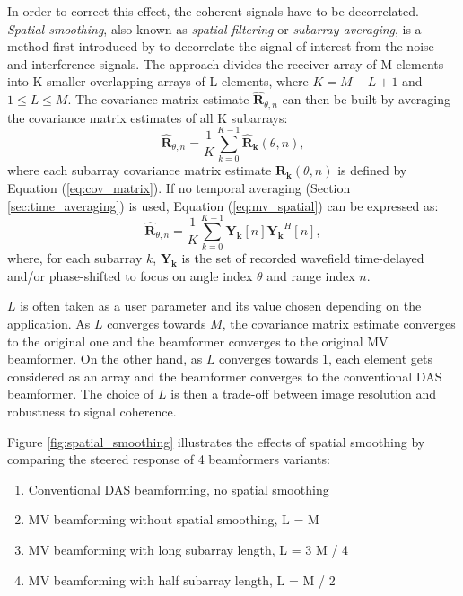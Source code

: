 In order to correct this effect, the coherent signals have to be decorrelated. \textit{Spatial smoothing}, also known as \textit{spatial filtering} or \textit{subarray averaging}, is a method first introduced by \cite{Evans_spatial} to decorrelate the signal of interest from the noise-and-interference signals. The approach divides the receiver array of M elements into K smaller overlapping arrays of L elements, where $K = M - L + 1$ and $1 \leq L \leq M$. The covariance matrix estimate $\boldsymbol{\hat{R}}_{\theta, n}$ can then be built by averaging the covariance matrix estimates of all K subarrays:
\begin{equation}
    \boldsymbol{\hat{R}}_{\theta, n} = \frac{1}{K} \sum_{k=0}^{K-1} \boldsymbol{\hat{R}_k}(\theta, n),
\label{eq:mv_spatial}
\end{equation}
\noindent
where each subarray covariance matrix estimate $\boldsymbol{R_k}(\theta, n)$ is defined by Equation (\ref{eq:cov_matrix}). If no temporal averaging (Section \ref{sec:time_averaging}) is used, Equation (\ref{eq:mv_spatial}) can be expressed as:
\begin{equation}
    \boldsymbol{\hat{R}}_{\theta, n} = \frac{1}{K} \sum_{k=0}^{K-1} \boldsymbol{Y_k}[n] \boldsymbol{Y_k}^H[n],
\end{equation}
\noindent
where, for each subarray $k$, $\boldsymbol{Y_k}$ is the set of recorded wavefield time-delayed and/or phase-shifted to focus on angle index $\theta$ and range index $n$.

$L$ is often taken as a user parameter and its value chosen depending on the application. As $L$ converges towards $M$, the covariance matrix estimate converges to the original one and the beamformer converges to the original MV beamformer. On the other hand, as $L$ converges towards 1, each element gets considered as an array and the beamformer converges to the conventional DAS beamformer. The choice of $L$ is then a trade-off between image resolution and robustness to signal coherence.
\par
Figure \ref{fig:spatial_smoothing} illustrates the effects of spatial smoothing by comparing the steered response of 4 beamformers variants:
\begin{enumerate}
    \item Conventional DAS beamforming, no spatial smoothing
    \item MV beamforming without spatial smoothing, L = M
    \item MV beamforming with long subarray length, L = 3 M / 4
    \item MV beamforming with half subarray length, L = M / 2
\end{enumerate}

